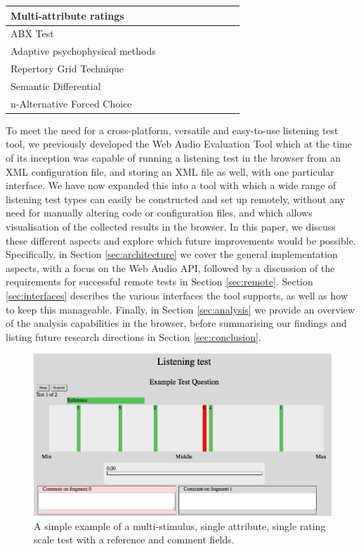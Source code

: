 \documentclass{sig-alternate}
\begin{document}
\begin{table}[ht]
\begin{center}
\begin{tabular}{|*{9}{l|}}
	    		 Multi-attribute ratings & & & \checkmark & & & & & \checkmark \\ \hline
	    		 ABX Test & & \checkmark & \checkmark & & & & & \checkmark \\ \hline
	    		 Adaptive psychophysical methods & & & & & & & \checkmark & \\ \hline 
	    		 Repertory Grid Technique & & & & & & & \checkmark & \\ \hline
	    		 Semantic Differential  & & & & & & \checkmark & \checkmark & \\ \hline
	    		 n-Alternative Forced Choice & & & & & & \checkmark & & \\ \hline
	    	\end{tabular}
	 \end{center}
	 \label{tab:toolboxes}
	 \end{table}

    To meet the need for a cross-platform, versatile and easy-to-use listening test tool, we previously developed the Web Audio Evaluation Tool \cite{waet} which at the time of its inception was capable of running a listening test in the browser from an XML configuration file, and storing an XML file as well, with one particular interface. We have now expanded this into a tool with which a wide range of listening test types can easily be constructed and set up remotely, without any need for manually altering code or configuration files, and which allows visualisation of the collected results in the browser. In this paper, we discuss these different aspects and explore which future improvements would be possible. Specifically, in Section \ref{sec:architecture} we cover the general implementation aspects, with a focus on the Web Audio API, followed by a discussion of the requirements for successful remote tests in Section \ref{sec:remote}. Section \ref{sec:interfaces} describes the various interfaces the tool supports, as well as how to keep this manageable. Finally, in Section \ref{sec:analysis} we provide an overview of the analysis capabilities in the browser, before summarising our findings and listing future research directions in Section \ref{sec:conclusion}.

    \begin{figure}[tb]
    	\centering
    	\includegraphics[width=.5\textwidth]{interface.png}
    	\caption{A simple example of a multi-stimulus, single attribute, single rating scale test with a reference and comment fields.}
    	\label{fig:interface}
    \end{figure}
\end{document}
